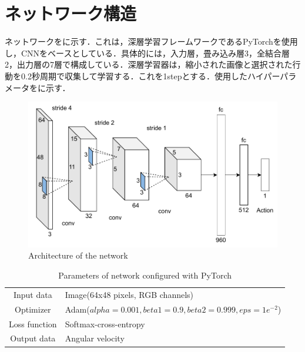 
\section{ネットワーク構造}

  ネットワークをに示す．これは，深層学習フレームワークであるPyTorch\cite{pytorch}を使用し，CNNをベースとしている．具体的には，入力層，畳み込み層3，全結合層2，出力層の7層で構成している．深層学習器は，縮小された画像と選択された行動を0.2秒周期で収集して学習する．これを1stepとする．使用したハイパーパラメータをに示す．

  \vspace{1cm}

  \begin{figure}[h]
    \centering
    \includegraphics[keepaspectratio, scale=0.60] {images/pdf/RobotGuidance_network}
    \caption{Architecture of the network}
    \label{Fig:RobotGuidance_network}
  \end{figure}

  \vspace{0.5cm}

  \begin{table}[hbtp]
    \caption{Parameters of network configured with PyTorch}
    \label{tab:Parameters of network configured with pytorch}
    \centering
    \begin{tabular}{c||l}
      \hline
      Input data & Image(64x48 pixels, RGB channels) \\
      Optimizer & Adam($alpha = 0.001, beta1 = 0.9, beta2 =  0.999, eps = 1e^{-2}$)\\
      Loss function & Softmax-cross-entropy\\
      Output data & Angular velocity\\
      \hline
    \end{tabular}
  \end{table}

\newpage
